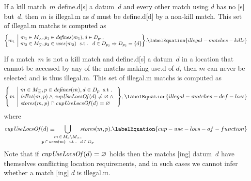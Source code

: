 If a \gls{kill match}~$m$ \gls{define.d}[s] a \gls{datum}~$d$ and every other
\gls{match} using $d$ has no [s] but~$d$, then $m$
is \gls{illegal.m} as $d$ must be \gls{define.d}[d] by a non-\gls{kill match}.
%
This set of \gls{illegal.m} \glspl{match} is computed as
%
\begin{equation}
  \mSetBuilder*{m_1}%
               {%
                 \begin{array}{@{}l@{}}
                   m_1 \in \mKillMatchSet,
                   p_1 \in \mDefines(m_1),
                   d \in \mDataSet[p_1], \\
                   m_2 \in \mKillMatchCompSet,
                   p_2 \in \mUses(m_2) \text{ \st }
                   d \in \mDataSet[p_2] \mImp \mDataSet[p_2] = \mSet{d}
                 \end{array}
               }\!.
  \labelEquation{illegal-matches-kills}
\end{equation}

If a \gls{match}~$m$ is not a \gls{kill match} and \gls{define.d}[s] a
\gls{datum}~$d$ in a \gls{location} that cannot be accessed by any of the
\glspl{match} making \gls{use.d} of $d$, then $m$ can never be selected and is
thus \gls{illegal.m}.
%
This set of \gls{illegal.m} \glspl{match} is computed as
%
\begin{equation}
  \mSetBuilder*{m}%
               {%
                 \begin{array}{@{}l@{}}
                   m \in \mKillMatchCompSet,
                   p \in \mDefines(m),
                   d \in \mDataSet[p] \hspace{-1pt} \text{ \st} \\
                   \mIsExt(m, p)
                   \mAnd
                   \mCupUseLocsOf(d) \neq \mEmptySet
                   \mAnd \mbox{} \\
                   \mStores(m, p) \cap \mCupUseLocsOf(d) = \mEmptySet
                 \end{array}
               }\!,
  \labelEquation{illegal-matches-def-locs}
\end{equation}
%
where
%
\begin{equation}
  \mCupUseLocsOf(d)
  \equiv
  \hspace{-2.5em}
  \bigcup_{\substack{%
                   m \, \in \, \mMatchSet[d] \setminus \mKillMatchSet, \\
                   p \, \in \, \mUses(m)
                   \text{ \st } d \, \in \, \mDataSet[p]
                  }}
    \hspace{-2.5em}
    \mStores(m, p).
  \labelEquation{cup-use-locs-of-function}
\end{equation}
%
Note that if \mbox{$\operatorname{\textrm{\textit{cupUseLocsOf}}}(d) = \varnothing$} holds then the
\glspl{match} [ing] \gls{datum}~$d$ have themselves conflicting
\gls{location} requirements, and in such cases we cannot infer whether a
\gls{match} [ing] $d$ is \gls{illegal.m}.

